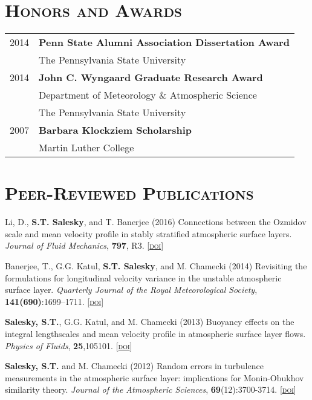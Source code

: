 \documentclass[11pt,letterpaper]{article}
\begin{document}
\section*{\textsc{Honors and Awards}} 
\begin{tabular}{l l}
2014 & \textbf{Penn State Alumni Association Dissertation Award} \\
     & The Pennsylvania State University \\[1.5\parskip]

2014 & \textbf{John C. Wyngaard Graduate Research Award} \\
     & Department of Meteorology \& Atmospheric Science \\ & The Pennsylvania State University \\[1.5\parskip]

2007 & \textbf{Barbara Klockziem Scholarship} \\
     & Martin Luther College

\end{tabular}

\section*{\textsc{Peer-Reviewed Publications}} 

Li, D., \textbf{S.T. Salesky}, and T. Banerjee (2016) Connections between
the Ozmidov scale and mean velocity profile in stably stratified atmospheric
surface layers. \textit{Journal of Fluid Mechanics}, \textbf{797}, R3. [\href{http://doi.org/10.1017/jfm.2016.311}{\textsc{doi}}]

Banerjee, T., G.G. Katul, \textbf{S.T. Salesky}, and M. Chamecki (2014) Revisiting the formulations for longitudinal velocity variance in the unstable atmospheric surface layer. \textit{Quarterly Journal of the Royal Meteorological Society}, \textbf{141(690)}:1699--1711. [\href{http://doi.org/10.1002/qj.2472}{\textsc{doi}}] 

\textbf{Salesky, S.T.}, G.G. Katul, and M. Chamecki (2013) Buoyancy effects on the integral lengthscales and mean velocity profile in atmospheric surface layer flows. \textit{Physics of Fluids}, \textbf{25},105101. [\href{http://doi.org/10.1063/1.4823747}{\textsc{doi}}]

\textbf{Salesky, S.T.} and M. Chamecki (2012) Random errors in turbulence measurements in the atmospheric surface layer: implications for Monin-Obukhov similarity theory. \textit{Journal of the Atmospheric Sciences}, \textbf{69}(12):3700-3714. [\href{http://doi.org/10.1175/JAS-D-12-096.1}{\textsc{doi}}]
\end{document}
